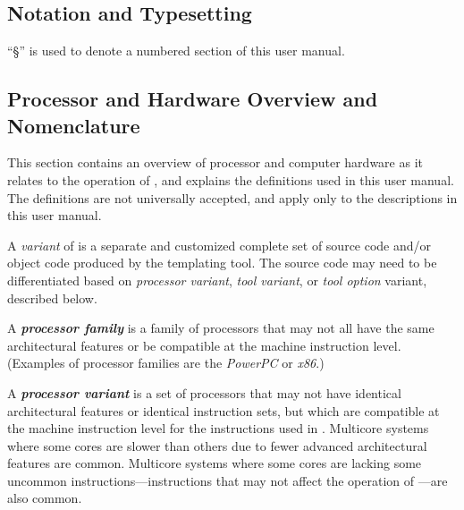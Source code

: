 \subsection{Notation and Typesetting}
\label{cldd0:snom0:snts0}

``\S{}'' is used to denote a numbered section
of this user manual.


\subsection{Processor and Hardware Overview and Nomenclature}
\label{cldd0:snom0:spnc0}

This section contains an overview of processor and computer hardware
as it relates to the operation of \emph{\productbasenameshort{}},
and explains the definitions used in this user manual.  The definitions
are not universally accepted, and apply only to the descriptions in this
user manual.

A \emph{variant} of \emph{\productbasenameshort{}} is a separate
and customized complete set of \emph{\productbasenameshort{}}
source code and/or object code 
produced by the templating tool.  The
\emph{\productbasenameshort{}} source code may need to
be differentiated based on \emph{processor variant},
\emph{tool variant},
or \emph{tool option} variant, described below.

A \emph{\textbf{processor family}} is
a family of processors that may not all have the same 
architectural features or be compatible at the machine instruction 
level.  (Examples of processor families are the \emph{PowerPC} or 
\emph{x86}.)

A \emph{\textbf{processor variant}} is
a set of processors that may not have identical architectural
features or identical instruction sets, but which are compatible
at the machine instruction level for the instructions used in
\emph{\productbasenameshort{}}\@.  Multicore systems where
some cores are slower than others due to fewer advanced architectural
features are common.  Multicore systems where some cores are lacking
some uncommon instructions---instructions that may not affect
the operation of \emph{\productbasenameshort{}}---are also common.

